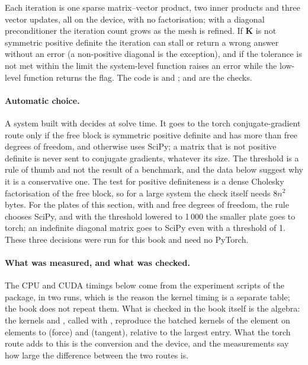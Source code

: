 Each iteration is one sparse matrix--vector product, two inner products and three vector updates, all on the device, with no factorisation; with a diagonal preconditioner the iteration count grows as the mesh is refined. If $\bm K$ is not symmetric positive definite the iteration can stall or return a wrong answer without an error (a non-positive diagonal is the exception), and if the tolerance is not met within the limit the system-level function raises an error while the low-level function returns the flag. The code is  and ;  and  are the checks.

\paragraph{Automatic choice.} A system built with  decides at solve time. It goes to the torch conjugate-gradient route only if the free block is symmetric positive definite and has more than \bktAutoThr{} free degrees of freedom, and otherwise uses SciPy; a matrix that is not positive definite is never sent to conjugate gradients, whatever its size. The threshold is a rule of thumb and not the result of a benchmark, and the data below suggest why it is a conservative one. The test for positive definiteness is a dense Cholesky factorisation of the free block, so for a large system the check itself needs $8n^2$ bytes. For the plates of this section, with \bktAutoSmallN{} and \bktAutoBigN{} free degrees of freedom, the rule chooses SciPy, and with the threshold lowered to 1\,000 the smaller plate goes to torch; an indefinite diagonal matrix goes to SciPy even with a threshold of 1. These three decisions were run for this book and need no PyTorch.

\paragraph{What was measured, and what was checked.} The CPU and CUDA timings below come from the experiment scripts of the package, in two runs, which is the reason the kernel timing is a separate table; the book does not repeat them. What is checked in the book itself is the algebra: the kernels  and , called with , reproduce the batched kernels of the element on \bktShadowNe{}  elements to \bktShadowForce{} (force) and \bktShadowTangent{} (tangent), relative to the largest entry. What the torch route adds to this is the conversion and the device, and the measurements say how large the difference between the two routes is.

